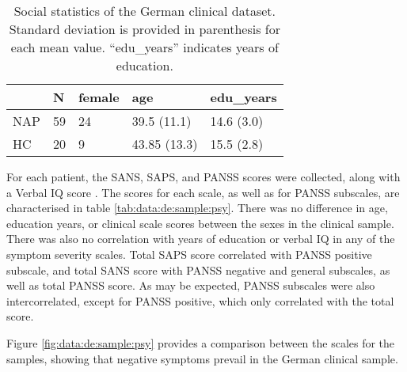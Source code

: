 \begin{table}[ht!]
\begin{center}
\begin{tabular}{lllll}
\hline
& \textbf{N} & \textbf{female} & \textbf{age} & \textbf{edu\_years} \\ 
\hline
NAP & 59         & 24              & 39.5 (11.1)  & 14.6 (3.0)               \\
HC  & 20         & 9               & 43.85 (13.3) & 15.5 (2.8)               \\ 
\hline
\end{tabular}
\captionsetup{width=\textwidth}
\caption[German Clinical Dataset]{\label{tab:data:de:sample} Social statistics of the German clinical dataset. Standard deviation is provided in parenthesis for each mean value. ``edu\_years'' indicates years of education.}
\end{center}
\end{table}

For each patient, the SANS, SAPS, and PANSS scores were collected, along with a Verbal IQ score \citep{schmidt1992vocabulary}. The scores for each scale, as well as for PANSS subscales, are characterised in table \ref{tab:data:de:sample:psy}. There was no difference in age, education years, or clinical scale scores between the sexes in the clinical sample. There was also no correlation with years of education or verbal IQ in any of the symptom severity scales. Total SAPS score correlated with PANSS positive subscale, and total SANS score with PANSS negative and general subscales, as well as total PANSS score. As may be expected, PANSS subscales were also intercorrelated, except for PANSS positive, which only correlated with the total score.

Figure \ref{fig:data:de:sample:psy} provides a comparison between the scales for the samples, showing that negative symptoms prevail in the German clinical sample.


